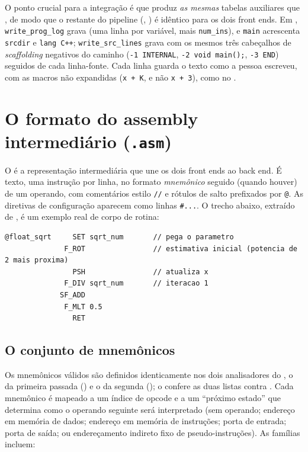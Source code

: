 O ponto crucial para a integração é que  produz \emph{as mesmas}
tabelas auxiliares que , de modo que o restante do pipeline
(, ) é idêntico para os dois front ends. Em
, \lstinline|write_prog_log| grava  (uma linha
por variável, mais \lstinline|num_ins|), e \lstinline|main| acrescenta
\lstinline|srcdir| e \lstinline|lang C++|; \lstinline|write_src_lines| grava
 com os mesmos três cabeçalhos de \emph{scaffolding} negativos
do caminho \cmm{} (\lstinline|-1 INTERNAL|, \lstinline|-2 void main();|,
\lstinline|-3 END|) seguidos de cada linha-fonte. Cada linha guarda o texto como a
pessoa escreveu, com as macros não expandidas (\lstinline|x + K|, e não
\lstinline|x + 3|), como no \cmm{}.

\section{O formato do assembly intermediário (\texttt{.asm})}
\label{sec:yanc-asm}

O  é a representação intermediária que une os dois front ends ao back
end. É texto, uma instrução por linha, no formato \emph{mnemônico} seguido (quando
houver) de um operando, com comentários estilo \lstinline|//| e rótulos de salto
prefixados por \lstinline|@|. As diretivas de configuração aparecem como linhas
\lstinline|#...|. O trecho abaixo, extraído de
, é um exemplo real de corpo de
rotina:

\begin{lstlisting}
@float_sqrt     SET sqrt_num       // pega o parametro
              F_ROT                // estimativa inicial (potencia de 2 mais proxima)
                PSH                // atualiza x
              F_DIV sqrt_num       // iteracao 1
             SF_ADD
              F_MLT 0.5
                RET
\end{lstlisting}

\subsection{O conjunto de mnemônicos}
\label{sec:yanc-asm-mnemonics}

Os mnemônicos válidos são definidos identicamente nos dois analisadores do
, o da primeira passada () e o da segunda
(); o  confere as duas listas contra
. Cada mnemônico
é mapeado a um índice de opcode e a um \enquote{próximo estado} que determina como
o operando seguinte será interpretado (sem operando; endereço em memória de dados;
endereço em memória de instruções; porta de entrada; porta de saída; ou
endereçamento indireto fixo de pseudo-instruções). As famílias incluem:

